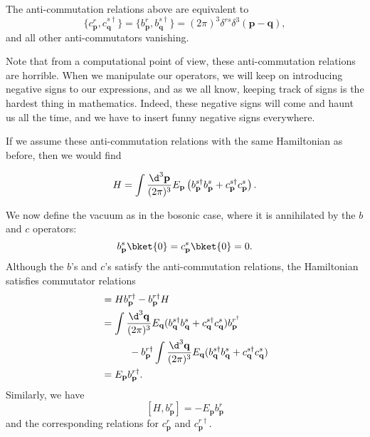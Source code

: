 \documentclass[a4paper]{article}
\begin{document}
\begin{prop}
  The anti-commutation relations above are equivalent to
\[
  \{c_\mathbf{p}^r, c_\mathbf{q}^{s\dagger}\} = \{b_\mathbf{p}^r, b_\mathbf{q}^{s\dagger}\} = (2\pi)^3 \delta^{rs} \delta^3(\mathbf{p} - \mathbf{q}),
\]
and all other anti-commutators vanishing.
\end{prop}
Note that from a computational point of view, these anti-commutation relations are horrible. When we manipulate our operators, we will keep on introducing negative signs to our expressions, and as we all know, keeping track of signs is the hardest thing in mathematics. Indeed, these negative signs will come and haunt us all the time, and we have to insert funny negative signs everywhere.

If we assume these anti-commutation relations with the same Hamiltonian as before, then we would find
\begin{prop}
  \[
    H = \int \frac{\d^3 \mathbf{p}}{(2\pi)^3} E_\mathbf{p} \left(b_\mathbf{p}^{s\dagger} b_\mathbf{p}^s + c_\mathbf{p}^{s\dagger}c_\mathbf{p}^s\right).
  \]
\end{prop}
We now define the vacuum as in the bosonic case, where it is annihilated by the $b$ and $c$ operators:
\[
  b_\mathbf{p}^s\bket{0} = c_\mathbf{p}^s \bket{0} = 0.
\]
Although the $b$'s and $c$'s satisfy the anti-commutation relations, the Hamiltonian satisfies commutator relations
\begin{align*}
  [H, b_\mathbf{p}^{r\dagger}] &= H b_\mathbf{p}^{r\dagger} - b_\mathbf{p}^{r\dagger} H \\
  &= \int \frac{\d^3 \mathbf{q}}{(2\pi)^3} E_\mathbf{q} (b_\mathbf{q}^{s\dagger} b_\mathbf{q}^s + c_\mathbf{q}^{s\dagger}c_\mathbf{q}^s) b_\mathbf{p}^{r^\dagger}\\
  &\hphantom{=}\quad\quad - b_\mathbf{p}^{r\dagger} \int \frac{\d^3 \mathbf{q}}{(2\pi)^3} E_\mathbf{q}(b_\mathbf{q}^{s\dagger} b_\mathbf{q}^s + c_\mathbf{q}^{s\dagger}c_\mathbf{q}^s)\\
  &= E_\mathbf{p} b_\mathbf{p}^{r\dagger}.
\end{align*}
Similarly, we have
\[
  [H, b_\mathbf{p}^r] = -E_\mathbf{p}b_\mathbf{p}^r
\]
and the corresponding relations for $c_\mathbf{p}^r$ and $c_\mathbf{p}^{r\dagger}$.
\end{document}

